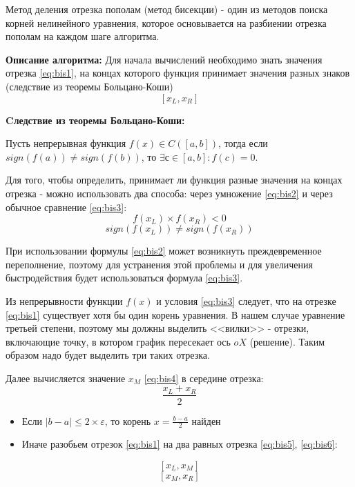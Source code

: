 \documentclass[a4paper, 12pt]{article}   	%
\begin{document}
Метод деления отрезка пополам (метод бисекции) - один из методов поиска корней нелинейного уравнения, которое основывается на разбиении отрезка пополам на каждом шаге алгоритма.

\textbf{Описание алгоритма: }
Для начала вычислений необходимо знать значения отрезка \eqref{eq:bis1}, на концах которого функция принимает значения разных знаков (следствие из теоремы Больцано-Коши)
\begin{equation}\label{eq:bis1}
[x_L, x_R]
\end{equation}
\begin{framed}
\textbf{Cледствие из теоремы Больцано-Коши:}

Пусть непрерывная функция $f(x) \in C([a, b])$, тогда если \\$sign(f(a)) \neq sign(f(b))$, то 
$\exists с \in [a, b]: f(c) = 0.$
\end{framed}

Для того, чтобы определить, принимает ли функция разные значения на концах отрезка - можно использовать два способа: через умножение \eqref{eq:bis2} и через обычное сравнение \eqref{eq:bis3}:
\begin{equation}\label{eq:bis2}
 f(x_L) \times f(x_R) < 0
 \end{equation}
 \begin{equation}\label{eq:bis3}
 sign(f(x_L)) \neq sign(f(x_R))
 \end{equation}
 
При использовании формулы \eqref{eq:bis2} может возникнуть преждевременное переполнение, поэтому для устранения этой проблемы и для увеличения быстродействия будет использоваться формула \eqref{eq:bis3}.

Из непрерывности функции $f(x)$ и условия \eqref{eq:bis3} следует, что на отрезке \eqref{eq:bis1} существует хотя бы один корень уравнения. В нашем случае уравнение третьей степени, поэтому мы должны выделить <<вилки>> - отрезки, включающие точку, в котором график пересекает ось $oX$ (решение). Таким образом надо будет выделить три таких отрезка.

Далее вычисляется значение $x_M$ \eqref{eq:bis4} в середине отрезка:
\begin{equation}\label{eq:bis4}
 \frac{x_L+x_R}{2}
 \end{equation}
 
 \begin{itemize}
\item Если $|b - a| \leq 2 \times \varepsilon$, то корень $x = \frac{b-a}{2}$ найден
\item Иначе разобьем отрезок \eqref{eq:bis1} на два равных отрезка \eqref{eq:bis5}, \eqref{eq:bis6}:
\end{itemize}
\begin{equation}\label{eq:bis5}
[x_L, x_M]
\end{equation}
\begin{equation}\label{eq:bis6}
[x_M, x_R]
\end{equation}
\end{document}
